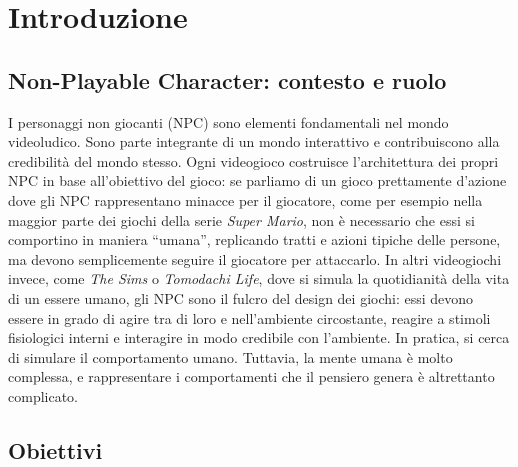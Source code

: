 \chapter{Introduzione}

\section{Non-Playable Character:  contesto e ruolo}

I personaggi non giocanti (NPC) sono elementi fondamentali nel mondo videoludico. Sono parte integrante di un mondo interattivo e contribuiscono alla credibilità del mondo stesso. Ogni videogioco costruisce l'architettura dei propri NPC in base all'obiettivo del gioco: se parliamo di un gioco prettamente d'azione dove gli NPC rappresentano minacce per il giocatore, come per esempio nella maggior parte dei giochi della serie \textit{Super Mario}, non è necessario che essi si comportino in maniera ``umana'', replicando tratti e azioni tipiche delle persone, ma devono semplicemente seguire il giocatore per attaccarlo. In altri videogiochi invece, come \textit{The Sims}\cite{thesims} o \textit{Tomodachi Life}\cite{tomodachilife}, dove si simula la quotidianità della vita di un essere umano, gli NPC sono il fulcro del design dei giochi: essi devono essere in grado di agire tra di loro e nell'ambiente circostante, reagire a stimoli fisiologici interni e interagire in modo credibile con l'ambiente. In pratica, si cerca di simulare il comportamento umano.
Tuttavia, la mente umana è molto complessa, e rappresentare i comportamenti che il pensiero genera è altrettanto complicato.

\section{Obiettivi}

